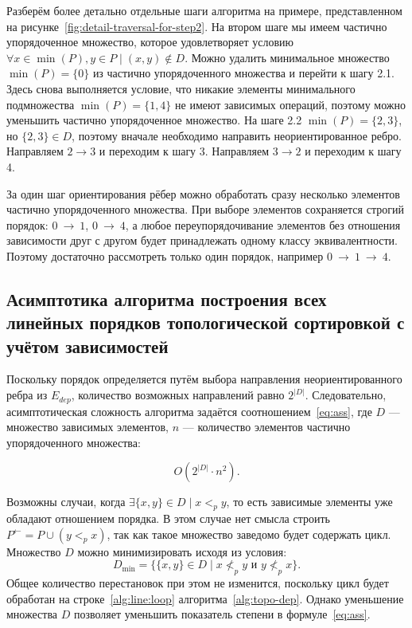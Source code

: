Разберём более детально отдельные шаги алгоритма на примере,
представленном на рисунке~\ref{fig:detail-traversal-for-step2}. На
втором шаге мы имеем частично упорядоченное множество, которое
удовлетворяет условию $\forall x \in \min(P), y \in P \mid (x, y)
\not \in D$. Можно удалить минимальное множество $\min(P) = \{0\}$ из
частично упорядоченного множества и перейти к шагу 2.1. Здесь снова
выполняется условие, что никакие элементы минимального подмножества
$\min(P) = \{1, 4\}$ не имеют зависимых операций, поэтому можно
уменьшить частично упорядоченное множество. На шаге 2.2 $\min(P) =
\{2, 3\}$, но $\{2, 3\} \in D$, поэтому вначале необходимо направить
неориентированное ребро. Направляем $2 \rightarrow 3$ и переходим к
шагу 3. Направляем $3 \rightarrow 2$ и переходим к шагу 4.

За один шаг ориентирования рёбер можно обработать сразу несколько
элементов частично упорядоченного множества. При выборе элементов
сохраняется строгий порядок: $0~\rightarrow~1$, $0~\rightarrow~4$, а
любое переупорядочивание элементов без отношения зависимости друг с
другом будет принадлежать одному классу эквивалентности. Поэтому
достаточно рассмотреть только один порядок, например
$0~\rightarrow~1~\rightarrow~4$.


\subsection{Асимптотика алгоритма построения всех линейных порядков
топологической сортировкой с учётом зависимостей}
\label{sec:ch2/dep-comp}

Поскольку порядок определяется путём выбора направления
неориентированного ребра из $E_{dep}$, количество возможных
направлений равно $2^{|D|}$. Следовательно, асимптотическая сложность
алгоритма задаётся соотношением~\ref{eq:ass}, где $D$ — множество
зависимых элементов, $n$ — количество элементов частично
упорядоченного множества:

\begin{equation}
  O(2^{|D|} \cdot n^2).
  \label{eq:ass}
\end{equation}

Возможны случаи, когда $\exists \{x, y\} \in D \mid x <_{p} y$, то
есть зависимые элементы уже обладают отношением порядка. В этом
случае нет смысла строить $P^{\leftarrow} = P \cup (y <_{p} x)$, так
как такое множество заведомо будет содержать цикл. Множество $D$
можно минимизировать исходя из условия:
\[
  D_{\min} = \{\{x, y\} \in D \mid x \not <_{p} y \text{ и } y
  \not <_{p} x\}.
\]
Общее количество перестановок при этом не изменится, поскольку цикл
будет обработан на строке~\ref{alg:line:loop}
алгоритма~\ref{alg:topo-dep}. Однако
уменьшение множества $D$ позволяет уменьшить показатель степени в
формуле~\ref{eq:ass}.

